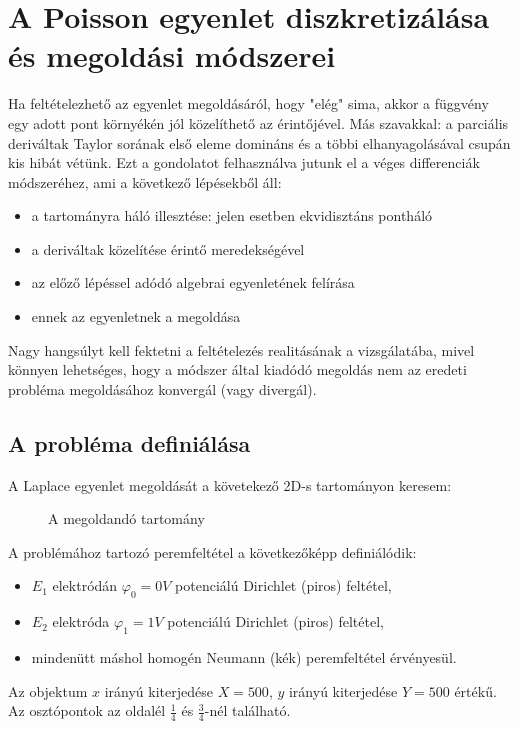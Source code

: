 \chapter{A Poisson egyenlet diszkretizálása és megoldási módszerei}
Ha feltételezhető az egyenlet megoldásáról, hogy "elég" sima, akkor a függvény egy adott pont környékén jól közelíthető az érintőjével.
Más szavakkal: a parciális deriváltak Taylor sorának első eleme domináns és a többi elhanyagolásával csupán kis hibát vétünk.
Ezt a gondolatot felhasználva jutunk el a véges differenciák módszeréhez, ami a következő lépésekből áll:
\begin{itemize}
\item a tartományra háló illesztése: jelen esetben ekvidisztáns pontháló
\item a deriváltak közelítése érintő meredekségével
\item az előző lépéssel adódó algebrai egyenletének felírása
\item ennek az egyenletnek a megoldása
\end{itemize}
Nagy hangsúlyt kell fektetni a feltételezés realitásának a vizsgálatába, mivel könnyen lehetséges, hogy a módszer által kiadódó megoldás nem az eredeti probléma megoldásához konvergál (vagy divergál).

\section{A probléma definiálása}
A Laplace egyenlet megoldását a követekező 2D-s tartományon keresem:
\begin{figure}[!ht]
\centering
\caption{A megoldandó tartomány} 
\end{figure}
A problémához tartozó peremfeltétel a következőképp definiálódik:
\begin{itemize}
\item $E_1$ elektródán $\varphi_0 = 0 V$ potenciálú Dirichlet (piros) feltétel, 
\item $E_2$ elektróda $\varphi_1 = 1 V$ potenciálú Dirichlet (piros) feltétel,
\item mindenütt máshol homogén Neumann (kék) peremfeltétel érvényesül.
\end{itemize}
Az objektum $x$ irányú kiterjedése $X = 500$, $y$ irányú kiterjedése $Y=500$ értékű. Az osztópontok az oldalél $\tfrac14$ és $\tfrac34$-nél található.


